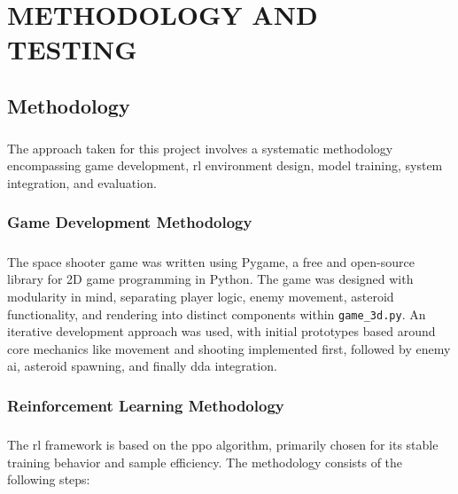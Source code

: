 \chapter{\MakeUppercase{Methodology and Testing}}

\section{Methodology}
\paragraph{} The approach taken for this project involves a systematic methodology encompassing game development, \ac{rl} environment design, model training, system integration, and evaluation.

\subsection{Game Development Methodology}
\paragraph{} The space shooter game was written using Pygame, a free and open-source library for 2D game programming in Python. The game was designed with modularity in mind, separating player logic, enemy movement, asteroid functionality, and rendering into distinct components within \texttt{game\_3d.py}. An iterative development approach was used, with initial prototypes based around core mechanics like movement and shooting implemented first, followed by enemy \ac{ai}, asteroid spawning, and finally \ac{dda} integration.

\subsection{Reinforcement Learning Methodology}
\paragraph{} The \ac{rl} framework is based on the \ac{ppo} algorithm, primarily chosen for its stable training behavior and sample efficiency. The methodology consists of the following steps:

